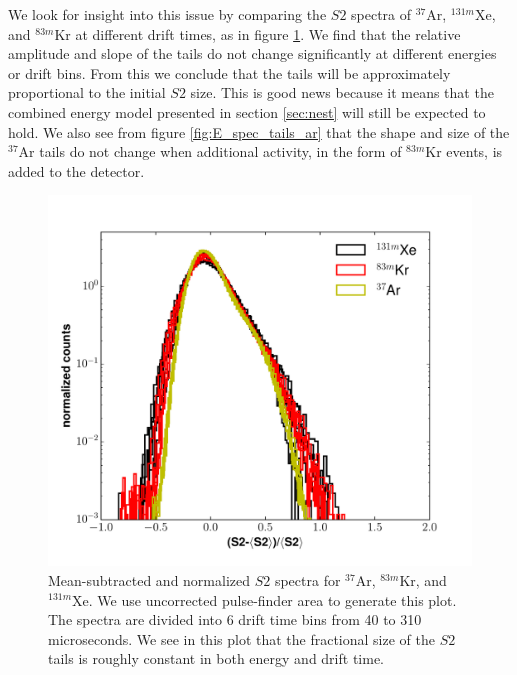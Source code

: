 {We look for insight into this issue by comparing the $S2$ spectra of $^{37}$Ar, $^{131m}$Xe, and $^{83m}$Kr at different drift times, as in figure \ref{fig:E_spec_tails}. We find that the relative amplitude and slope of the tails do not change significantly at different energies or drift bins. From this we conclude that the tails will be approximately proportional to the initial $S2$ size. This is good news because it means that the combined energy model presented in section \ref{sec:nest} will still be expected to hold. We also see from figure \ref{fig:E_spec_tails_ar} that the shape and size of the $^{37}$Ar tails do not change when additional activity, in the form of $^{83m}$Kr events, is added to the detector.
\begin{figure}[h!]
  \centering
  \includegraphics[width=\textwidth]{Figures/S2_tail_spec_all.pdf}
  \caption{Mean-subtracted and normalized $S2$ spectra for $^{37}$Ar, $^{83m}$Kr, and $^{131m}$Xe. We use uncorrected pulse-finder area to generate this plot. The spectra are divided into 6 drift time bins from 40 to 310 microseconds. We see in this plot that the fractional size of the $S2$ tails is roughly constant in both energy and drift time.}
\label{fig:E_spec_tails} 
\end{figure}

}
